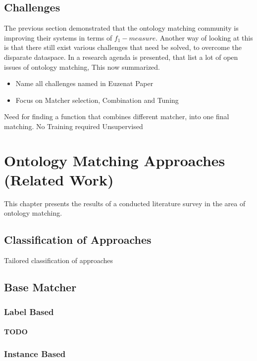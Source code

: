 \documentclass[11pt,titlepage,oneside,openany,a4paper]{report}
\begin{document}
\clearpage
\section{Challenges}
\label{sec:challeng_ontology_matching}
The previous section demonstrated that the ontology matching community is improving their systems in terms of $f_1-measure$. Another way of looking at this is that there still exist various challenges that need be solved, to overcome the disparate dataspace. In \cite{6104044} a research agenda is presented, that list a lot of open issues of ontology matching, This now summarized.





\begin{itemize}
\item Name all challenges named in  Euzenat Paper
\item Focus on Matcher selection, Combination and Tuning
\end{itemize}
Need for finding a function that combines different matcher, into one final matching. 
No Training required
Unsupervised


\chapter{Ontology Matching Approaches (Related Work)}
This chapter presents the results of a conducted literature survey in the area of ontology matching.
\section{Classification of Approaches}
Tailored classification of approaches
\section{Base Matcher}

\subsection{Label Based}
 \subsubsection{TODO}
\subsection{Instance Based}
\end{document}
